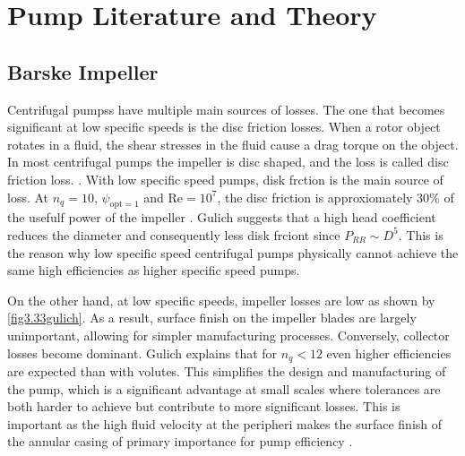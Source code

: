 \section{Pump Literature and Theory}

\subsection{Barske Impeller}


Centrifugal pumpss have multiple main sources of losses. The one that becomes significant at low specific speeds is the disc friction losses. When a rotor object rotates in a fluid, the shear stresses in the fluid cause a drag torque on the object. In most centrifugal pumps the impeller is disc shaped, and the loss is called disc friction loss. . With low specific speed pumps, disk frction is the main source of loss. At $n_q=10$, $\psi_{\textrm{opt}=1}$ and $\mathrm{Re}=10^7$, the disc friction is approxiomately $30\%$ of the usefulf power of the impeller \cite{gulichpage103}. Gulich suggests that a high head coefficient  reduces the diameter and consequently less disk frciont since $P_{RR}\sim D^5$. This is the reason why low specific speed centrifugal pumps physically cannot achieve the same high efficiencies as higher specific speed pumps. 

On the other hand, at low specific speeds, impeller losses are low as shown by \cref{fig3.33gulich}.  As a result, surface finish on the impeller blades are largely unimportant, allowing for simpler manufacturing processes. Conversely, collector losses become dominant.  Gulich explains \cite{gulich7.12} that for $n_q<12$ even higher efficiencies are expected than with volutes. This simplifies the design and manufacturing of the pump, which is a significant advantage at small scales where tolerances are both harder to achieve but contribute to more significant losses.  This is important as the high fluid velocity at the peripheri makes the surface finish of the annular casing of primary importance for pump efficiency \cite{lockdesignfeatures}.

